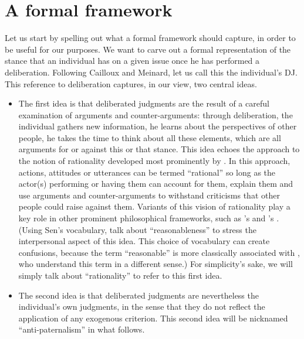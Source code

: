 \documentclass[version=3.21, pagesize, twoside=off, bibliography=totoc, DIV=calc, fontsize=12pt, a4paper, french, english]{scrartcl}
\begin{document}
\section{A formal framework}
Let us start by spelling out what a formal framework should capture, in order to be useful for our purposes. We want to carve out a formal representation of the stance that an individual has on a given issue once he has performed a deliberation. Following Cailloux and Meinard, let us call this the individual's \ac{DJ}. This reference to deliberation captures, in our view, two central ideas. 
\begin{itemize}
\item The first idea is that deliberated judgments are the result of a careful examination of arguments and counter-arguments: through deliberation, the individual gathers new information, he learns about the perspectives of other people, he takes the time to think about all these elements, which are all arguments for or against this or that stance. This idea echoes the approach to the notion of rationality developed most prominently by \citet{habermas_theorie_1981}. In this approach, actions, attitudes or utterances can be termed “rational” so long as the actor(s) performing or having them can account for them, explain them and use arguments and counter-arguments to withstand criticisms that other people could raise against them.  Variants of this vision of rationality play a key role in other prominent philosophical frameworks, such as \citeauthor{scanlon_what_2000}’s \citeyearpar{scanlon_what_2000} and \citeauthor{sen_idea_2009}’s \citeyearpar{sen_idea_2009}. (Using Sen's vocabulary, \citet{bartkowski_beyond_2018} talk about ``reasonableness'' to stress the interpersonal aspect of this idea. This choice of vocabulary can create confusions, because the term ``reasonable'' is more classically associated with \citet{rawls_political_2005}, who understand this term in a different sense.) For simplicity's sake, we will simply talk about ``rationality'' to refer to this first idea.
\item The second idea is that deliberated judgments are nevertheless the individual's own judgments, in the sense that they do not reflect the application of any exogenous criterion. This second idea will be nicknamed ``anti-paternalism'' in what follows. 
\end{itemize}
\end{document}
